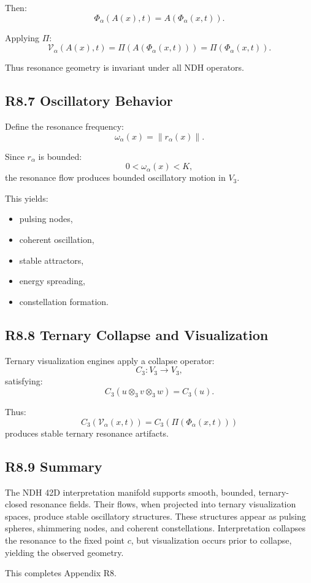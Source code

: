 Then:
\[
\Phi_{\alpha}(A(x),t) = A(\Phi_{\alpha}(x,t)).
\]

Applying $\Pi$:
\[
\mathcal{V}_{\alpha}(A(x),t)
= \Pi(A(\Phi_{\alpha}(x,t)))
= \Pi(\Phi_{\alpha}(x,t)).
\]

Thus resonance geometry is invariant under all NDH operators.

\subsection*{R8.7 Oscillatory Behavior}

Define the resonance frequency:
\[
\omega_{\alpha}(x) = \| r_{\alpha}(x) \|.
\]

Since $r_{\alpha}$ is bounded:
\[
0 < \omega_{\alpha}(x) < K,
\]
the resonance flow produces bounded oscillatory motion in $V_3$.

This yields:

\begin{itemize}
    \item pulsing nodes,
    \item coherent oscillation,
    \item stable attractors,
    \item energy spreading,
    \item constellation formation.
\end{itemize}

\subsection*{R8.8 Ternary Collapse and Visualization}

Ternary visualization engines apply a collapse operator:
\[
C_3 : V_3 \to V_3,
\]
satisfying:
\[
C_3(u \otimes_3 v \otimes_3 w) = C_3(u).
\]

Thus:
\[
C_3(\mathcal{V}_{\alpha}(x,t)) = C_3(\Pi(\Phi_{\alpha}(x,t)))
\]
produces stable ternary resonance artifacts.

\subsection*{R8.9 Summary}

The NDH 42D interpretation manifold supports smooth, bounded, ternary-
closed resonance fields. Their flows, when projected into ternary
visualization spaces, produce stable oscillatory structures. These
structures appear as pulsing spheres, shimmering nodes, and coherent
constellations. Interpretation collapses the resonance to the fixed point
$c$, but visualization occurs prior to collapse, yielding the observed
geometry.

This completes Appendix R8.
